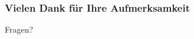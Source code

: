 \begin{frame}
    \frametitle{Vielen Dank für Ihre Aufmerksamkeit}

    \begin{center}
        Fragen?
    \end{center}
\end{frame}